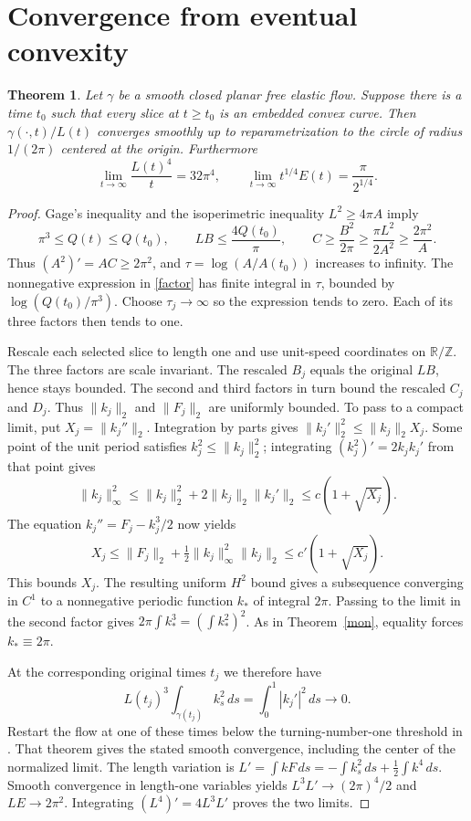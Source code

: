 \documentclass[10pt]{article}
\newtheorem{theorem}{Theorem}
\newcommand{\ds}{\,ds}
\begin{document}
\section{Convergence from eventual convexity}
\begin{theorem}\label{conv}
Let \(\gamma\) be a smooth closed planar free elastic flow. Suppose there
is a time \(t_0\) such that every slice at \(t\geq t_0\) is an embedded
convex curve. Then \(\gamma(\cdot,t)/L(t)\) converges smoothly up to
reparametrization to the circle of radius \(1/(2\pi)\) centered at the
origin. Furthermore
\[
 \lim_{t\to\infty}\frac{L(t)^4}{t}=32\pi^4,\qquad
 \lim_{t\to\infty}t^{1/4}E(t)=\frac{\pi}{2^{1/4}} .
\]
\end{theorem}
\begin{proof}
Gage's inequality and the isoperimetric inequality \(L^2\geq4\pi A\)
imply
\[
 \pi^3\leq Q(t)\leq Q(t_0),\qquad
 LB\leq\frac{4Q(t_0)}{\pi},\qquad
 C\geq\frac{B^2}{2\pi}\geq\frac{\pi L^2}{2A^2}
      \geq\frac{2\pi^2}{A}.
\]
Thus \((A^2)'=AC\geq2\pi^2\), and
\(\tau=\log(A/A(t_0))\) increases to infinity.
The nonnegative expression in \eqref{factor} has finite integral in
\(\tau\), bounded by \(\log(Q(t_0)/\pi^3)\).
Choose \(\tau_j\to\infty\) so the expression tends to zero.
Each of its three factors then tends to one.

Rescale each selected slice to length one and use unit-speed coordinates
on \(\mathbb R/\mathbb Z\). The three factors are scale invariant. The
rescaled \(B_j\) equals the original \(L B\), hence stays bounded.
The second and third factors in turn bound the rescaled \(C_j\) and
\(D_j\). Thus \(\|k_j\|_2\) and \(\|F_j\|_2\) are uniformly bounded.
To pass to a compact limit, put \(X_j=\|k_j''\|_2\).
Integration by parts gives \(\|k_j'\|_2^2\leq \|k_j\|_2 X_j\).
Some point of the unit period satisfies \(k_j^2\leq \|k_j\|_2^2\);
integrating \((k_j^2)'=2k_j k_j'\) from that point gives
\[
 \|k_j\|_\infty^2\leq \|k_j\|_2^2+2\|k_j\|_2\|k_j'\|_2
 \leq c(1+\sqrt{X_j}).
\]
The equation \(k_j''=F_j-k_j^3/2\) now yields
\[
 X_j\leq \|F_j\|_2+\tfrac12\|k_j\|_\infty^2\|k_j\|_2
 \leq c'(1+\sqrt{X_j}).
\]
This bounds \(X_j\). The resulting uniform \(H^2\) bound gives a
subsequence converging in \(C^1\) to a nonnegative periodic function
\(k_*\) of integral \(2\pi\). Passing to the limit in the second factor
gives \(2\pi\int k_*^3=(\int k_*^2)^2\). As in Theorem~\ref{mon}, equality
forces \(k_*\equiv 2\pi\).

At the corresponding original times \(t_j\) we therefore have
\[
 L(t_j)^3\int_{\gamma(t_j)} k_s^2\ds
   =\int_0^1 |k_j'|^2\,ds \longrightarrow 0 .
\]
Restart the flow at one of these times below the turning-number-one
threshold in \cite[Theorem 1.2]{mw}. That theorem gives the stated smooth
convergence, including the center of the normalized limit.
The length variation is \(L'=\int kF\ds=-\int k_s^2\ds+\tfrac12\int
k^4\ds\). Smooth convergence in length-one variables yields
\(L^3L'\to(2\pi)^4/2\) and \(LE\to2\pi^2\).
Integrating \((L^4)'=4L^3L'\) proves the two limits.
\end{proof}
\end{document}
